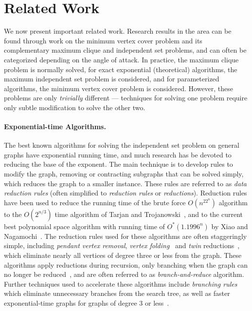 \documentclass[twoside,leqno,twocolumn]{article}
\begin{document}
\section{Related Work}
\label{sec:related_work}
We now present important related work. 
Research results in the area can be found through work on the minimum vertex cover problem and its complementary maximum clique and independent set problems, and can often be categorized depending on the angle of attack. In practice, the maximum clique problem is normally solved, for exact exponential (theoretical) algorithms, the maximum independent set problem is considered, and for parameterized algorithms, the minimum vertex cover problem is considered. However, these problems are only \emph{trivially} different --- techniques for solving one problem require only subtle modification to solve the other two.

\paragraph*{Exponential-time Algorithms.}
The best known algorithms for solving the independent set problem on general graphs have exponential running time, and much research has be devoted to reducing the base of the exponent. The main technique is  to develop rules to modify the graph, removing or contracting subgraphs that can be solved simply, which reduces the graph to a smaller instance. These rules are referred to as \emph{data reduction rules} (often simplified to \emph{reduction rules} or \emph{reductions}).
Reduction rules have been used to reduce the running time of the brute force $O(n^22^n)$ algorithm to the $O(2^{n/3})$ time algorithm of Tarjan and Trojanowski~\cite{tarjan-1977}, and to the current best polynomial space algorithm with running time of $O^*(1.1996^n)$ by Xiao and Nagamochi~\cite{xiao2017exact}. 
The reduction rules used for these algorithms are often staggeringly simple, including \emph{pendant vertex removal}, \emph{vertex folding}~\cite{chen-1999} and \emph{twin} reductions~\cite{Xiao201392}, which eliminate nearly all vertices of degree three or less from the graph. 
These algorithms apply reductions during recursion, only branching when the graph can no longer be reduced~\cite{fomin-2010}, and are often referred to as \emph{branch-and-reduce} algorithm. Further techniques used to accelerate these algorithms include \emph{branching rules}~\cite{} which eliminate unnecessary branches from the search tree, as well as faster exponential-time graphs for graphs of degree 3 or less~\cite{}.
\end{document}
